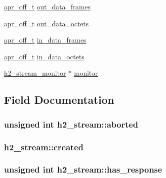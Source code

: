 \begin{DoxyCompactItemize}
\hyperlink{group__apr__platform_ga6938af9075cec15c88299109381aa984}{apr\+\_\+off\+\_\+t} \hyperlink{structh2__stream_ab8d0b634c35858d21b25b004dc36484c}{out\+\_\+data\+\_\+frames}
\item 
\hyperlink{group__apr__platform_ga6938af9075cec15c88299109381aa984}{apr\+\_\+off\+\_\+t} \hyperlink{structh2__stream_a980f4e4df3267e3615f2d330e3f987ba}{out\+\_\+data\+\_\+octets}
\item 
\hyperlink{group__apr__platform_ga6938af9075cec15c88299109381aa984}{apr\+\_\+off\+\_\+t} \hyperlink{structh2__stream_a0db67940c308f4133b2c820e12cc720f}{in\+\_\+data\+\_\+frames}
\item 
\hyperlink{group__apr__platform_ga6938af9075cec15c88299109381aa984}{apr\+\_\+off\+\_\+t} \hyperlink{structh2__stream_adc3d70d40b1edfd2055013880ff3d206}{in\+\_\+data\+\_\+octets}
\item 
\hyperlink{structh2__stream__monitor}{h2\+\_\+stream\+\_\+monitor} $\ast$ \hyperlink{structh2__stream_a514a1a96e1416de34f21c25fa2306ad7}{monitor}
\end{DoxyCompactItemize}


\subsection{Field Documentation}
\subsubsection[{\texorpdfstring{aborted}{aborted}}]{\setlength{\rightskip}{0pt plus 5cm}unsigned {\bf int} h2\+\_\+stream\+::aborted}\hypertarget{structh2__stream_a701825d6309bf1085273feef2688fe52}{}\label{structh2__stream_a701825d6309bf1085273feef2688fe52}
\subsubsection[{\texorpdfstring{created}{created}}]{ h2\+\_\+stream\+::created}\hypertarget{structh2__stream_a99db8afbff0bea2e9a4bcf2e1e212dae}{}\label{structh2__stream_a99db8afbff0bea2e9a4bcf2e1e212dae}
\subsubsection[{\texorpdfstring{has\+\_\+response}{has_response}}]{\setlength{\rightskip}{0pt plus 5cm}unsigned {\bf int} h2\+\_\+stream\+::has\+\_\+response}\hypertarget{structh2__stream_a565eb406d2ebe6d4cf630553a169c466}{}\label{structh2__stream_a565eb406d2ebe6d4cf630553a169c466}
